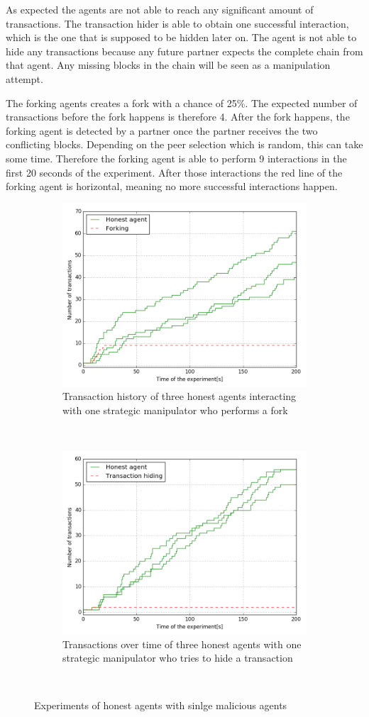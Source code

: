As expected the agents are not able to reach any significant amount of transactions. The transaction
hider is able to obtain one successful interaction, which is the one that is supposed to be hidden 
later on. The agent is not able to hide any transactions because any future partner expects the 
complete chain from that agent. Any missing blocks in the chain will be seen as a manipulation attempt.

The forking agents creates a fork with a chance of 25\%. The expected number of transactions before
the fork happens is therefore 4. After the fork happens, the forking agent is detected by a partner 
once the partner receives the two conflicting blocks. Depending on the peer selection which is 
random, this can take some time. Therefore the forking agent is able to perform 9 interactions in the first 20 seconds of the experiment. 
After those interactions the red  line of the forking agent is horizontal, meaning no more 
successful interactions happen. 

\begin{figure}
    \begin{subfigure}{\textwidth}
      \centering
      \includegraphics[width=.6\linewidth]{images/forking}
      \caption{Transaction history of three honest agents interacting with one strategic manipulator who performs a fork}
      \label{fig:forking}
    \end{subfigure}\\
    \begin{subfigure}{\textwidth}
      \centering
      \includegraphics[width=.6\linewidth]{images/transaction_hiding}
      \caption{Transactions over time of three honest agents with one strategic manipulator who tries to hide a transaction}
      \label{fig:DFR_empty_exchanges}
    \end{subfigure}\\
    \caption{Experiments of honest agents with sinlge malicious agents}
    \label{fig:malicious}
\end{figure}

